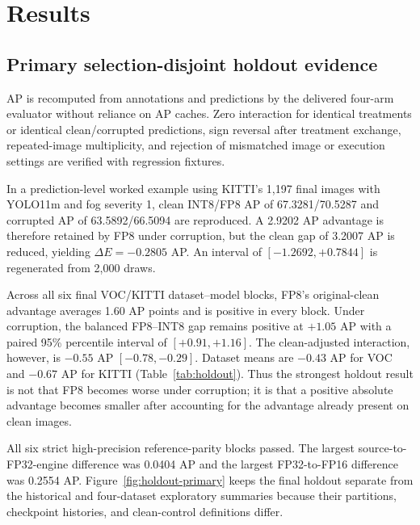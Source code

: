 \documentclass[a4paper,fleqn]{cas-dc}
\begin{document}
\section{Results}
\label{sec:results}

\subsection{Primary selection-disjoint holdout evidence}
\label{sec:protocol-check}
\label{sec:holdout-results}

AP is recomputed from annotations and predictions by the delivered four-arm evaluator without reliance on AP caches. Zero interaction for identical treatments or identical clean/corrupted predictions, sign reversal after treatment exchange, repeated-image multiplicity, and rejection of mismatched image or execution settings are verified with regression fixtures.

\begin{samepage}
In a prediction-level worked example using KITTI's 1,197 final images with YOLO11m and fog severity 1, clean INT8/FP8 AP of 67.3281/70.5287 and corrupted AP of 63.5892/66.5094 are reproduced. A 2.9202 AP advantage is therefore retained by FP8 under corruption, but the clean gap of 3.2007 AP is reduced, yielding $\Delta E=-0.2805$ AP. An interval of $[-1.2692,+0.7844]$ is regenerated from 2,000 draws.
\end{samepage}

Across all six final VOC/KITTI dataset--model blocks, FP8's original-clean advantage averages 1.60 AP points and is positive in every block. Under corruption, the balanced FP8--INT8 gap remains positive at $+1.05$ AP with a paired 95\% percentile interval of $[+0.91,+1.16]$. The clean-adjusted interaction, however, is $-0.55$ AP $[-0.78,-0.29]$. Dataset means are $-0.43$ AP for VOC and $-0.67$ AP for KITTI (Table~\ref{tab:holdout}). Thus the strongest holdout result is not that FP8 becomes worse under corruption; it is that a positive absolute advantage becomes smaller after accounting for the advantage already present on clean images.

All six strict high-precision reference-parity blocks passed. The largest source-to-FP32-engine difference was 0.0404 AP and the largest FP32-to-FP16 difference was 0.2554 AP. Figure~\ref{fig:holdout-primary} keeps the final holdout separate from the historical and four-dataset exploratory summaries because their partitions, checkpoint histories, and clean-control definitions differ.
\end{document}
